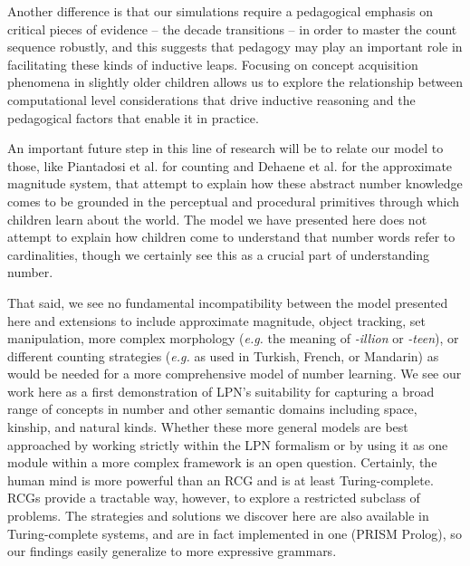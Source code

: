 \documentclass[10pt,letterpaper]{article}
\begin{document}
Another difference is that our simulations require a pedagogical
emphasis on critical pieces of evidence -- the decade transitions --
in order to master the count sequence robustly, and this suggests that
pedagogy may play an important role in facilitating these kinds of
inductive leaps. Focusing on concept acquisition phenomena in slightly
older children allows us to explore the relationship between
computational level considerations that drive inductive reasoning and
the pedagogical factors that enable it in practice.


An important future step in this line of research will be to relate
our model to those, like Piantadosi et al. for counting and Dehaene et
al. for the approximate magnitude system, that attempt to explain how
these abstract number knowledge comes to be grounded in the perceptual
and procedural primitives through which children learn about the
world. The model we have presented here does not attempt to explain
how children come to understand that number words refer to
cardinalities, though we certainly see this as a crucial part of
understanding number.

That said, we see no fundamental incompatibility between the model
presented here and extensions to include approximate magnitude, object
tracking, set manipulation, more complex morphology ({\it e.g.} the
meaning of \emph{-illion} or \emph{-teen}), or different counting
strategies ({\it e.g.} as used in Turkish, French, or Mandarin) as
would be needed for a more comprehensive model of number learning. We
see our work here as a first demonstration of LPN's suitability for
capturing a broad range of concepts in number and other semantic
domains including space, kinship, and natural kinds.  Whether these
more general models are best approached by working strictly within the
LPN formalism or by using it as one module within a more complex
framework is an open question. Certainly, the human mind is more
powerful than an RCG and is at least Turing-complete.  RCGs provide a
tractable way, however, to explore a restricted subclass of
problems. The strategies and solutions we discover here are also
available in Turing-complete systems, and are in fact implemented in
one (PRISM Prolog), so our findings easily generalize to more
expressive grammars.
\end{document}
